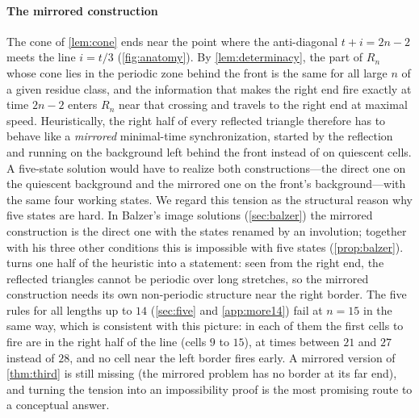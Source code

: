 \paragraph{The mirrored construction}
The cone of \cref{lem:cone} ends near the point where the anti-diagonal
$t+i=2n-2$ meets the line $i=t/3$ (\cref{fig:anatomy}). By \cref{lem:determinacy}, the part of $R_n$ whose cone lies
in the periodic zone behind the front is the same for all large $n$ of a
given residue class, and the information that makes the right end fire
exactly at time $2n-2$ enters $R_n$ near that crossing and travels to the
right end at maximal speed. Heuristically, the right half of every
reflected triangle therefore has to behave like a \emph{mirrored}
minimal-time synchronization, started by the reflection and running on the
background left behind the front instead of on quiescent cells. A
five-state solution would have to realize both constructions---the direct
one on the quiescent background and the mirrored one on the front's
background---with the same four working states. We regard this tension as
the structural reason why five states are hard. In Balzer's image solutions
(\cref{sec:balzer}) the mirrored construction is the direct one with the
states renamed by an involution; together with his three other conditions
this is impossible with five states (\cref{prop:balzer}).  turns one
half of the heuristic into a statement: seen from the right end, the
reflected triangles cannot be periodic over long stretches, so the mirrored
construction needs its own non-periodic structure near the right border. The
five rules for all lengths up to $14$ (\cref{sec:five} and \cref{app:more14}) fail at
$n=15$ in the same way, which is consistent with this picture: in each of
them the first cells to fire are in the right half of the line (cells $9$
to $15$), at times between $21$ and $27$ instead of $28$, and no cell near
the left border fires early.
A mirrored version of \cref{thm:third} is still missing (the mirrored
problem has no border at its far end), and turning the tension into an
impossibility proof is the most promising route to a conceptual answer.

